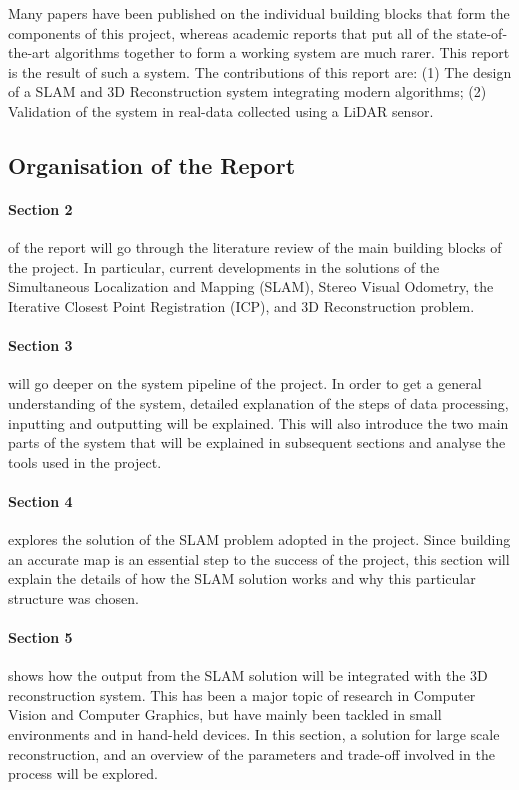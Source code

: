 \documentclass[11pt]{article}
\begin{document}
Many papers have been published on the individual building blocks that form the components of this project, whereas academic reports that put all of the state-of-the-art algorithms together to form a working system are much rarer. This report is the result of such a system. The contributions of this report are: (1) The design of a SLAM and 3D Reconstruction system integrating modern algorithms; (2) Validation of the system in real-data collected using a LiDAR sensor.
	
	\subsection{ Organisation of the Report}

\paragraph{Section 2} of the report will go through the literature review of the main building blocks of the project. In particular, current developments in the solutions of the Simultaneous Localization and Mapping (SLAM), Stereo Visual Odometry, the Iterative Closest Point Registration (ICP), and 3D Reconstruction problem.
	
\paragraph{Section 3} will go deeper on the system pipeline of the project. In order to get a general understanding of the system, detailed explanation of the steps of data processing, inputting and outputting will be explained. This will also introduce the two main parts of the system that will be explained in subsequent sections and analyse the tools used in the project.
		
\paragraph{Section 4} explores the solution of the SLAM problem adopted in the project. Since building an accurate map is an essential step to the success of the project, this section will explain the details of how the SLAM solution works and why this particular structure was chosen.
		
\paragraph{Section 5} shows how the output from the SLAM solution will be integrated with the 3D reconstruction system. This has been a major topic of research in Computer Vision and Computer Graphics, but have mainly been tackled in small environments and in hand-held devices. In this section, a solution for large scale reconstruction, and an overview of the parameters and trade-off involved in the process will be explored.
		
\end{document}
